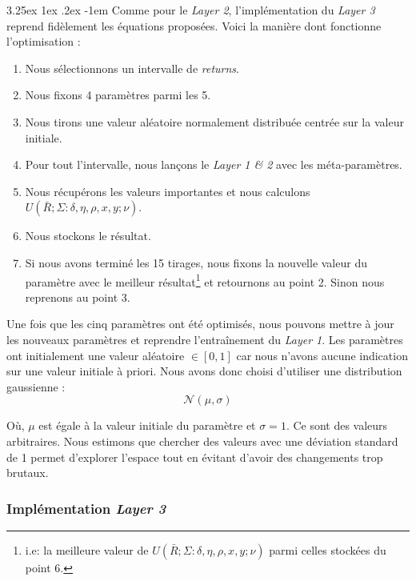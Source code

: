 \documentclass[a4paper, 11pt]{article}
\makeatletter
\renewcommand\paragraph{\@startsection{paragraph}{5}{\z@}%
  {3.25ex \@plus1ex \@minus.2ex}%
  {-1em}%
  {\normalfont\normalsize\bfseries}}
\makeatother
\begin{document}
\paragraph{}
Comme pour le \textit{Layer 2}, l'implémentation du \textit{Layer 3} reprend fidèlement les équations proposées. Voici la manière dont fonctionne
l'optimisation :
\begin{enumerate}
 \item Nous sélectionnons un intervalle de \textit{returns}.
 \item Nous fixons 4 paramètres parmi les 5.
 \item Nous tirons une valeur aléatoire normalement distribuée centrée sur la valeur initiale.
 \item Pour tout l'intervalle, nous lançons le \textit{Layer 1 \& 2} avec les méta-paramètres.
 \item Nous récupérons les valeurs importantes et nous calculons $U(\bar{R};\Sigma : \delta, \eta, \rho, x, y; \nu)$.
 \item Nous stockons le résultat.
 \item Si nous avons terminé les 15 tirages, nous fixons la nouvelle valeur du paramètre avec le meilleur résultat\footnote{i.e: la meilleure valeur de 
 $U(\bar{R};\Sigma : \delta, \eta, \rho, x, y; \nu)$ parmi celles stockées du point 6.} et retournons au point 2. Sinon nous reprenons au point 3.
\end{enumerate}

Une fois que les cinq paramètres ont été optimisés, nous pouvons mettre à jour les nouveaux paramètres et reprendre l'entraînement du \textit{Layer 1}.
Les paramètres ont initialement une valeur aléatoire $\in [0,1]$ car nous n'avons aucune indication sur une valeur initiale à priori. Nous avons donc choisi d'utiliser une distribution gaussienne :
$$\mathcal{N}(\mu,\sigma)$$

Où, $\mu$ est égale à la valeur initiale du paramètre et $\sigma = 1$. Ce sont des valeurs arbitraires. Nous estimons que chercher des valeurs avec une déviation
standard de 1 permet d'explorer l'espace tout en évitant d'avoir des changements trop brutaux.

\subsubsection{Implémentation \textit{Layer 3}}
\end{document}
